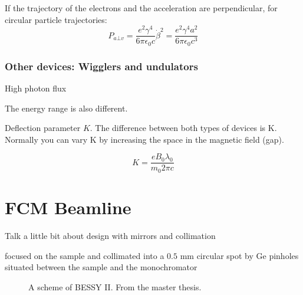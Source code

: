 If the trajectory of the electrons and the acceleration are perpendicular, for circular particle trajectories:
\begin{equation}
        P_{a \bot v}=\frac{e^2\gamma^4}{6\pi\epsilon_0c}\dot{\beta}^2=\frac{e^2\gamma^4a^2}{6\pi\epsilon_0c^3}
\end{equation}

\subsubsection{Other devices: Wigglers and undulators}

 High photon flux
 
The energy range is also different.

Deflection parameter $K$. The difference between both types of devices is K. Normally you can vary K by increasing the space in the magnetic field (gap).

\begin{equation}
        K=\frac{eB_0\lambda_0}{m_0 2\pi c}
\end{equation}


\section{FCM Beamline}

Talk a little bit about design with mirrors and collimation

focused on the sample and collimated into a \(0.5\) mm circular spot by Ge pinholes situated between the sample and the monochromator

\begin{figure}%
	\centering
		\caption{A scheme of BESSY II. From the master thesis.}
		\label{fig:FCMScheme}
\end{figure}

